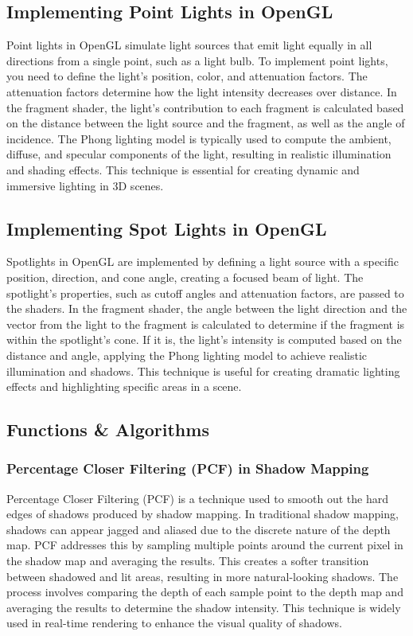 \documentclass[12pt]{article}
\begin{document}
	\subsection{Implementing Point Lights in OpenGL}
	Point lights in OpenGL simulate light sources that emit light equally in all directions from a single point, such as a light bulb. To implement point lights, you need to define the light's position, color, and attenuation factors. The attenuation factors determine how the light intensity decreases over distance. In the fragment shader, the light's contribution to each fragment is calculated based on the distance between the light source and the fragment, as well as the angle of incidence. The Phong lighting model is typically used to compute the ambient, diffuse, and specular components of the light, resulting in realistic illumination and shading effects. This technique is essential for creating dynamic and immersive lighting in 3D scenes.
	

	\subsection{Implementing Spot Lights in OpenGL}
	Spotlights in OpenGL are implemented by defining a light source with a specific position, direction, and cone angle, creating a focused beam of light. The spotlight's properties, such as cutoff angles and attenuation factors, are passed to the shaders. In the fragment shader, the angle between the light direction and the vector from the light to the fragment is calculated to determine if the fragment is within the spotlight's cone. If it is, the light's intensity is computed based on the distance and angle, applying the Phong lighting model to achieve realistic illumination and shadows. This technique is useful for creating dramatic lighting effects and highlighting specific areas in a scene.

	
	\subsection{Functions \& Algorithms}
	
	\subsubsection{Percentage Closer Filtering (PCF) in Shadow Mapping}
	Percentage Closer Filtering (PCF) is a technique used to smooth out the hard edges of shadows produced by shadow mapping. In traditional shadow mapping, shadows can appear jagged and aliased due to the discrete nature of the depth map. PCF addresses this by sampling multiple points around the current pixel in the shadow map and averaging the results. This creates a softer transition between shadowed and lit areas, resulting in more natural-looking shadows. The process involves comparing the depth of each sample point to the depth map and averaging the results to determine the shadow intensity. This technique is widely used in real-time rendering to enhance the visual quality of shadows.
	
\end{document}
